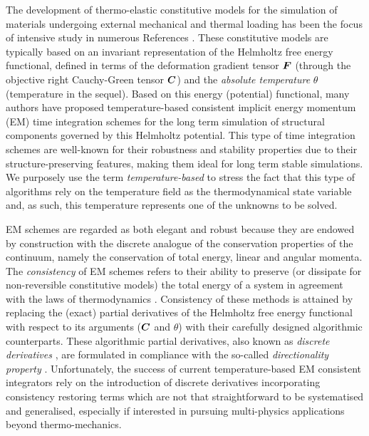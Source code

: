 The development of thermo-elastic constitutive models for the simulation of materials undergoing external mechanical and thermal loading has been the focus of intensive study in numerous References \cite{Betsch2018Thermo,Conde2017}. These constitutive models are typically based on an invariant representation of the Helmholtz free energy functional, defined in terms of the deformation gradient tensor $\boldsymbol{F}$ (through the objective right Cauchy-Green tensor $\boldsymbol{C}$) and the \textit{absolute temperature} $\theta$ (temperature in the sequel). Based on this energy (potential) functional, many authors \cite{Betsch2018Thermo,Conde2017} have proposed temperature-based consistent implicit energy momentum (EM) time integration schemes for the long term simulation of structural components governed by this Helmholtz potential. This type of time integration schemes are well-known for their robustness and stability properties due to their structure-preserving features, making them ideal for long term stable simulations. We purposely use the term \emph{temperature-based} to stress the fact that this type of algorithms rely on the temperature field as the thermodynamical state variable and, as such, this temperature represents one of the unknowns to be solved. 

EM schemes are regarded as both elegant and robust because they are endowed by construction with the discrete analogue of the conservation properties of the continuum, namely the conservation of total energy, linear and angular momenta. The \textit{consistency} of EM schemes refers to their ability to preserve (or dissipate for non-reversible constitutive models) the total energy of a system in agreement with the laws of thermodynamics \cite{Betsch_EM_viscoelasticity_2010,Betsch_EM_mixed_2017,Betsch2018Thermo,Conde2017}. Consistency of these methods is attained by replacing the (exact) partial derivatives of the Helmholtz free energy functional with respect to its arguments ($\boldsymbol{C}$ and $\theta$) with their carefully designed algorithmic counterparts. These algorithmic partial derivatives, also known as \textit{discrete derivatives} \cite{Betsch2018Thermo,Betsch_EM_mixed_2017,EM_Electro_1,Gonzalez_EM_2000,Simo_EM_1992}, are formulated in compliance with the so-called \textit{directionality property} \cite{Gonzalez_EM_2000}. Unfortunately, the success of current temperature-based EM consistent integrators rely on the introduction of discrete derivatives incorporating consistency restoring terms \cite{Hesch_Betsch_EM_thermo_2011} which are not that straightforward to be systematised and generalised, especially if interested in pursuing multi-physics applications beyond thermo-mechanics. 

